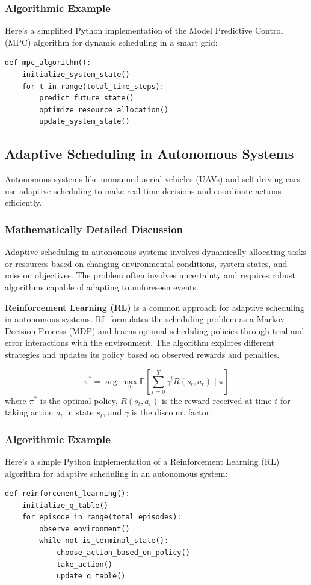 \documentclass[12pt]{book} %
\begin{document}
\subsubsection{Algorithmic Example}
Here's a simplified Python implementation of the Model Predictive Control (MPC) algorithm for dynamic scheduling in a smart grid:
\FloatBarrier
\begin{lstlisting}
def mpc_algorithm():
    initialize_system_state()
    for t in range(total_time_steps):
        predict_future_state()
        optimize_resource_allocation()
        update_system_state()
\end{lstlisting}
\FloatBarrier

\subsection{Adaptive Scheduling in Autonomous Systems}
Autonomous systems like unmanned aerial vehicles (UAVs) and self-driving cars use adaptive scheduling to make real-time decisions and coordinate actions efficiently.

\subsubsection{Mathematically Detailed Discussion}
Adaptive scheduling in autonomous systems involves dynamically allocating tasks or resources based on changing environmental conditions, system states, and mission objectives. The problem often involves uncertainty and requires robust algorithms capable of adapting to unforeseen events.

\textbf{Reinforcement Learning (RL)} is a common approach for adaptive scheduling in autonomous systems. RL formulates the scheduling problem as a Markov Decision Process (MDP) and learns optimal scheduling policies through trial and error interactions with the environment. The algorithm explores different strategies and updates its policy based on observed rewards and penalties.

\[
\pi^* = \arg\max_\pi \mathbb{E}\left[\sum_{t=0}^{T} \gamma^t R(s_t, a_t) \mid \pi\right]
\]
where \(\pi^*\) is the optimal policy, \(R(s_t, a_t)\) is the reward received at time \(t\) for taking action \(a_t\) in state \(s_t\), and \(\gamma\) is the discount factor.


\subsubsection{Algorithmic Example}
Here's a simple Python implementation of a Reinforcement Learning (RL) algorithm for adaptive scheduling in an autonomous system:
\FloatBarrier
\begin{lstlisting}
def reinforcement_learning():
    initialize_q_table()
    for episode in range(total_episodes):
        observe_environment()
        while not is_terminal_state():
            choose_action_based_on_policy()
            take_action()
            update_q_table()
\end{lstlisting}
\FloatBarrier
\end{document}

